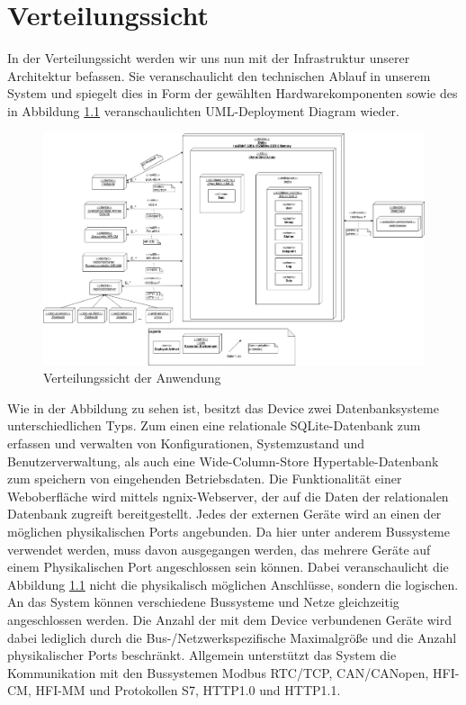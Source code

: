 \chapter{Verteilungssicht}
\label{ch:Verteilungssicht}
In der Verteilungssicht werden wir uns nun mit der Infrastruktur unserer Architektur befassen. Sie veranschaulicht den technischen Ablauf in unserem System und spiegelt dies in Form der gewählten Hardwarekomponenten sowie des in Abbildung \ref{fig:verteilung} veranschaulichten UML-Deployment Diagram wieder.

\begin{figure}[h]
	\centering
	\includegraphics[width=1.1\textwidth]{Graphics/verteiler.png}
	\caption{Verteilungssicht der Anwendung}
	\label{fig:verteilung}
\end{figure}

Wie in der Abbildung zu sehen ist, besitzt das Device zwei Datenbanksysteme unterschiedlichen Typs. Zum einen eine relationale SQLite-Datenbank zum erfassen und verwalten von Konfigurationen, Systemzustand und Benutzerverwaltung, als auch eine Wide-Column-Store Hypertable-Datenbank zum speichern von eingehenden Betriebsdaten.
Die Funktionalität einer Weboberfläche wird mittels ngnix-Webserver, der auf die Daten der relationalen Datenbank zugreift bereitgestellt. Jedes der externen Geräte wird an einen der möglichen physikalischen Ports angebunden. Da hier unter anderem Bussysteme verwendet werden, muss davon ausgegangen werden, das mehrere Geräte auf einem Physikalischen Port angeschlossen sein können. Dabei veranschaulicht die Abbildung \ref{fig:verteilung} nicht die physikalisch möglichen Anschlüsse, sondern die logischen. An das System können verschiedene Bussysteme und Netze gleichzeitig angeschlossen werden. Die Anzahl der mit dem Device verbundenen Geräte wird dabei lediglich durch die Bus-/Netzwerkspezifische Maximalgröße und die Anzahl physikalischer Ports beschränkt. Allgemein unterstützt das System die Kommunikation mit den Bussystemen Modbus RTC/TCP, CAN/CANopen, HFI-CM, HFI-MM und Protokollen S7, HTTP1.0 und HTTP1.1.  